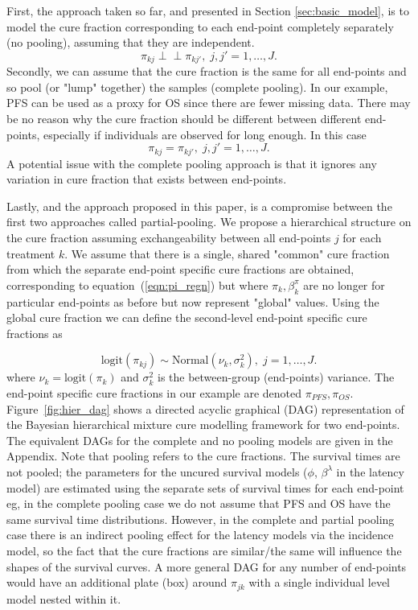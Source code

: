 \documentclass[AMA,STIX1COL]{WileyNJD-v2}
\begin{document}
First, the approach taken so far, and presented in Section \ref{sec:basic_model}, is to model the cure fraction corresponding to each end-point completely separately (no pooling), assuming that they are independent.
$$
\pi_{kj} \perp\!\!\!\perp \pi_{kj'}, \; j,j' = 1, \ldots, J.
$$
Secondly, we can assume that the cure fraction is the same for all end-points and so pool (or "lump" together) the samples (complete pooling). In our example, PFS can be used as a proxy for OS since there are fewer missing data.
There may be no reason why the cure fraction should be different between different end-points, especially if individuals are observed for long enough. In this case
$$
\pi_{kj} = \pi_{kj'}, \; j,j' = 1, \ldots, J.
$$
A potential issue with the complete pooling approach is that it ignores any variation in cure fraction that exists between end-points.

Lastly, and the approach proposed in this paper, is a compromise between the first two approaches called partial-pooling.
We propose a hierarchical structure on the cure fraction assuming exchangeability between all end-points $j$ for each treatment $k$.
We assume that there is a single, shared "common" cure fraction from which the separate end-point specific cure fractions are obtained, corresponding to equation~(\ref{eqn:pi_regn})
but where $\pi_{k}, \beta^{\pi}_{k}$ are no longer for particular end-points as before but now represent "global" values.
Using the global cure fraction we can define the second-level end-point specific cure fractions as

\begin{equation}\label{eqn:global_cf}
\text{logit}(\pi_{kj}) \sim \text{Normal}(\nu_k, \sigma_k^2), \; j = 1, \ldots, J.  
\end{equation}
\noindent
where $\nu_k = \text{logit}(\pi_k)$ and $\sigma_k^2$ is the between-group (end-points) variance.
The end-point specific cure fractions in our example are denoted $\pi_{PFS}, \pi_{OS}$.
Figure~\ref{fig:hier_dag} shows a directed acyclic graphical (DAG) representation of the Bayesian hierarchical mixture cure modelling framework for two end-points.
The equivalent DAGs for the complete and no pooling models are given in the Appendix.
Note that pooling refers to the cure fractions. The survival times are not pooled; the parameters for the uncured survival models ($\phi$, $\beta^{\lambda}$ in the latency model) are estimated using the separate sets of survival times for each end-point eg, in the complete pooling case we do not assume that PFS and OS have the same survival time distributions. However, in the complete and partial pooling case there is an indirect pooling effect for the latency models via the incidence model, so the fact that the cure fractions are similar/the same will influence the shapes of the survival curves. A more general DAG for any number of end-points would have an additional plate (box) around $\pi_{jk}$ with a single individual level model nested within it.
\end{document}
